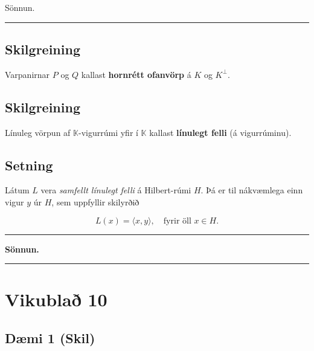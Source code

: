 \documentclass[]{book}
\begin{document}
Sönnun.

\begin{center}\rule{0.5\linewidth}{\linethickness}\end{center}

\hypertarget{skilgreining-26}{%
\section*{Skilgreining}\label{skilgreining-26}}

Varpanirnar \(P\) og \(Q\) kallast \textbf{hornrétt ofanvörp} á \(K\) og \(K^\perp\).

\hypertarget{skilgreining-27}{%
\section*{Skilgreining}\label{skilgreining-27}}

Línuleg vörpun af \(\mathbb K\)-vigurrúmi yfir í \(\mathbb K\) kallast \textbf{línulegt felli} (á vigurrúminu).

\hypertarget{setning-81}{%
\section*{Setning}\label{setning-81}}

Látum \(L\) vera \emph{samfellt línulegt felli} á Hilbert-rúmi \(H\). Þá er til nákvæmlega einn vigur \(y\) úr \(H\), sem uppfyllir skilyrðið

\[
L(x) = \langle x,y\rangle, \quad \text{fyrir öll }x\in H.
\]

\begin{center}\rule{0.5\linewidth}{\linethickness}\end{center}

\textbf{Sönnun.}

\begin{center}\rule{0.5\linewidth}{\linethickness}\end{center}

\hypertarget{vikubla-10}{%
\chapter*{Vikublað 10}\label{vikubla-10}}

\hypertarget{dmi-1-skil}{%
\section*{Dæmi 1 (Skil)}\label{dmi-1-skil}}
\end{document}
